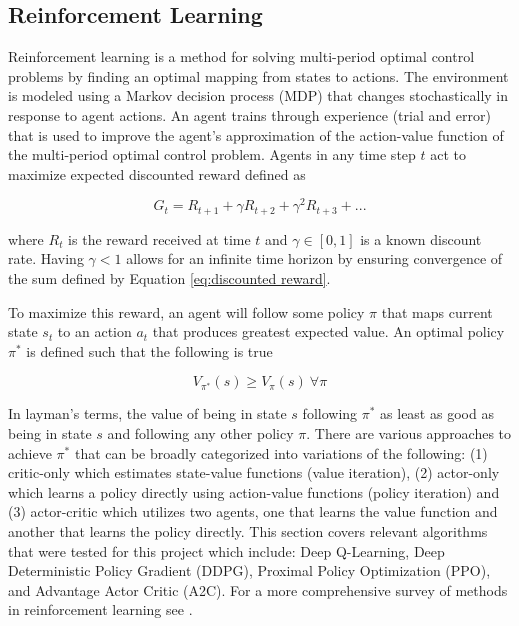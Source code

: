 \documentclass[12pt]{article}
\begin{document}
\subsection{Reinforcement Learning}

Reinforcement learning is a method for solving multi-period optimal control problems by finding an optimal mapping from states to actions. The environment is modeled using a Markov decision process (MDP) that changes stochastically in response to agent actions. An agent trains through experience (trial and error) that is used to improve the agent's approximation of the action-value function of the multi-period optimal control problem. Agents in any time step $t$ act to maximize expected discounted reward defined as

\begin{equation}
G_t = R_{t+1} + \gamma R_{t+2} + \gamma^2 R_{t+3} + ...
\label{eq:discounted reward}
\end{equation}

where $R_t$ is the reward received at time $t$ and $\gamma \in [0,1]$ is a known discount rate. Having $\gamma < 1$ allows for an infinite time horizon by ensuring convergence of the sum defined by Equation \ref{eq:discounted reward}.

To maximize this reward, an agent will follow some policy $\pi$ that maps current state $s_t$ to an action $a_t$ that produces greatest expected value. An optimal policy $\pi^*$ is defined such that the following is true

\begin{equation}
V_{\pi^*}(s) \geq V_{\pi}(s)\ \forall \pi
\label{eq:optimal policy}
\end{equation}

In layman's terms, the value of being in state $s$ following $\pi^*$ as least as good as being in state $s$ and following any other policy $\pi$. There are various approaches to achieve $\pi^*$ that can be broadly categorized into variations of the following: (1) critic-only which estimates state-value functions (value iteration), (2) actor-only which learns a policy directly using action-value functions (policy iteration) and (3) actor-critic which utilizes two agents, one that learns the value function and another that learns the policy directly. This section covers relevant algorithms that were tested for this project which include: Deep Q-Learning, Deep Deterministic Policy Gradient (DDPG), Proximal Policy Optimization (PPO), and Advantage Actor Critic (A2C). For a more comprehensive survey of methods in reinforcement learning see \cite{SuttonBarto}.
\end{document}
